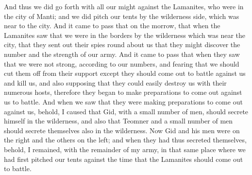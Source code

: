 \bverse \iffalse And thus we did go forth with all our might against the Lamanites, who were in the city of Manti; and we did pitch our tents by the wilderness side, which was near to the city. \fi
And thus we did go forth with all our might against the Lamanites, who were in the city of Manti; and we did pitch our tents by the wilderness side, which was near to the city.
\bverse \iffalse And it came to pass that on the morrow, that when the Lamanites saw that we were in the borders by the wilderness which was near the city, that they sent out their spies round about us that they might discover the number and the strength of our army. \fi
And it came to pass that on the morrow, that when the Lamanites saw that we were in the borders by the wilderness which was near the city, that they sent out their spies round about us that they might discover the number and the strength of our army.
\bverse \iffalse And it came to pass that when they saw that we were not strong, according to our numbers, and fearing that we should cut them off from their support except they should come out to battle against us and kill us, and also supposing that they could easily destroy us with their numerous hosts, therefore they began to make preparations to come out against us to battle. \fi
And it came to pass that when they saw that we were not strong, according to our numbers, and fearing that we should cut them off from their support except they should come out to battle against us and kill us, and also supposing that they could easily destroy us with their numerous hosts, therefore they began to make preparations to come out against us to battle.
\bverse \iffalse And when we saw that they were making preparations to come out against us, behold, I caused that Gid, with a small number of men, should secrete himself in the wilderness, and also that Teomner and a small number of men should secrete themselves also in the wilderness. \fi
And when we saw that they were making preparations to come out against us, behold, I caused that Gid, with a small number of men, should secrete himself in the wilderness, and also that Teomner and a small number of men should secrete themselves also in the wilderness.
\bverse \iffalse Now Gid and his men were on the right and the others on the left; and when they had thus secreted themselves, behold, I remained, with the remainder of my army, in that same place where we had first pitched our tents against the time that the Lamanites should come out to battle. \fi
Now Gid and his men were on the right and the others on the left; and when they had thus secreted themselves, behold, I remained, with the remainder of my army, in that same place where we had first pitched our tents against the time that the Lamanites should come out to battle.
